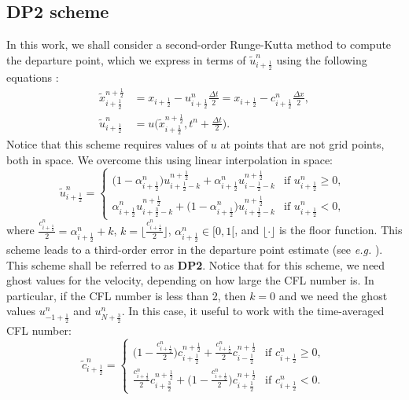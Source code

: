 \subsection{DP2 scheme}
\label{chp-adv1d-sec-DP2}
In this work, we shall
consider a second-order Runge-Kutta method to compute the departure point, which we express in terms of
$\tilde{u}^n_{i+\frac{1}{2}}$ using the following equations \citep{durran:2010}:
\begin{align}
	\label{chp-sec-flux:dp_DP2}
	\tilde{x}_{i+\frac{1}{2}}^{n+\frac{1}{2}} &= x_{i+\frac{1}{2}} - u_{i+\frac{1}{2}}^n
	 \frac{\Delta t}{2} = x_{i+\frac{1}{2}} - c_{i+\frac{1}{2}}^n \frac{\Delta x}{2}, \nonumber \\
	\tilde{u}^n_{i+\frac{1}{2}} &= u\bigg(\tilde{x}^{n+\frac{1}{2}}_{i+\frac{1}{2}}, t^n + \frac{\Delta t}{2}\bigg).
\end{align}
Notice that this scheme requires values of $u$ at points that are not grid points,
both in space. We overcome this using linear interpolation in space:
\begin{equation}
	\tilde{u}^n_{i+\frac{1}{2}} =
	\begin{cases}
		\big(1-\alpha_{i+\frac{1}{2}}^n \big)u^{n+\frac{1}{2}}_{i+\frac{1}{2}-k} +
        \alpha_{i+\frac{1}{2}}^n u^{n+\frac{1}{2}}_{i-\frac{1}{2}-k} & \text{if } {u}^n_{i+\frac{1}{2}}\geq 0,\\
		\alpha_{i+\frac{1}{2}}^n u^{n+\frac{1}{2}}_{i+\frac{3}{2}-k} + \big(1-\alpha_{i+\frac{1}{2}}^n\big)
        u^{n+\frac{1}{2}}_{i+\frac{1}{2}-k} & \text{if } {u}^n_{i+\frac{1}{2}} < 0,\
	\end{cases}
\end{equation}
where $\frac{c_{i+\frac{1}{2}}^n}{2} = \alpha_{i+\frac{1}{2}}^n + k$, 
$k=\lfloor \frac{c_{i+\frac{1}{2}}^n}{2} \rfloor$, $\alpha_{i+\frac{1}{2}}^n \in [0,1[$, and $\lfloor \cdot \rfloor$ is
the floor function. This scheme leads to a third-order error in the departure point estimate (see \textit{e.g.} 
\citet[Section 7.1.2]{durran:2010}). This scheme shall be referred to as \textbf{DP2}. 
Notice that for this scheme, we need ghost values for the velocity, depending on how large the CFL number is.
In particular, if the CFL number is less than 2, then $k=0$ and we need the ghost values $u_{-1+\frac{1}{2}}^n$ and $u_{N+\frac{3}{2}}^n$.
In this case, it useful to work with the time-averaged CFL number:
\begin{equation}
	\label{cfl-dp2}
	\tilde{c}^n_{i+\frac{1}{2}} =
	\begin{cases}
		\bigg(1-\frac{c_{i+\frac{1}{2}}^n}{2} \bigg)c^{n+\frac{1}{2}}_{i+\frac{1}{2}} +
     \frac{c_{i+\frac{1}{2}}^n}{2} c^{n+\frac{1}{2}}_{i-\frac{1}{2}} & \text{if } {c}^n_{i+\frac{1}{2}}\geq 0,\\
		\frac{c_{i+\frac{1}{2}}^n}{2} c^{n+\frac{1}{2}}_{i+\frac{3}{2}} + \bigg(1-\frac{c_{i+\frac{1}{2}}^n}{2}\bigg)
        c^{n+\frac{1}{2}}_{i+\frac{1}{2}} & \text{if } {c}^n_{i+\frac{1}{2}} < 0.\
	\end{cases}
\end{equation}

